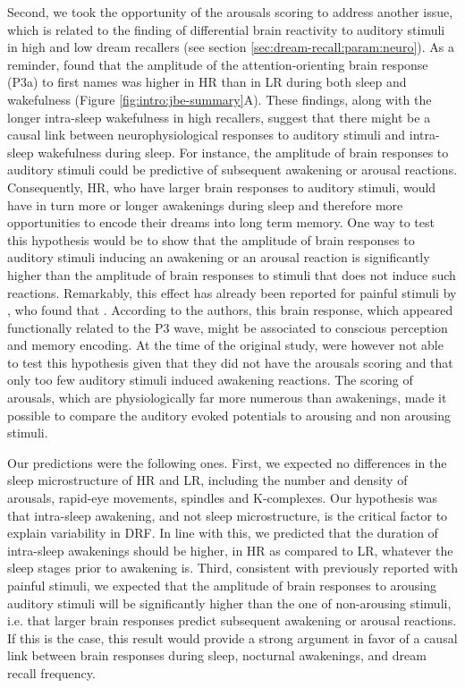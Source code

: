 Second, we took the opportunity of the arousals scoring to address another issue, which is related to the finding of differential brain reactivity to auditory stimuli in high and low dream recallers (see section \ref{sec:dream-recall:param:neuro}). As a reminder, \citet{eichenlaub_brain_2014} found that the amplitude of the attention-orienting brain response (P3a) to first names was higher in HR than in LR during both sleep and wakefulness (Figure \ref{fig:intro:jbe-summary}A). These findings, along with the longer intra-sleep wakefulness in high recallers, suggest that there might be a causal link between neurophysiological responses to auditory stimuli and intra-sleep wakefulness during sleep. For instance, the amplitude of brain responses to auditory stimuli could be predictive of subsequent awakening or arousal reactions. Consequently, HR, who have larger brain responses to auditory stimuli, would have in turn more or longer awakenings during sleep and therefore more opportunities to encode their dreams into long term memory. One way to test this hypothesis would be to show that the amplitude of brain responses to auditory stimuli inducing an awakening or an arousal reaction is significantly higher than the amplitude of brain responses to stimuli that does not induce such reactions. Remarkably, this effect has already been reported for painful stimuli by \citet{bastuji_laser_2008}, who found that . According to the authors, this brain response, which appeared functionally related to the P3 wave, might be associated to conscious perception and memory encoding. At the time of the original study, \citet{eichenlaub_brain_2014} were however not able to test this hypothesis given that they did not have the arousals scoring and that only too few auditory stimuli induced awakening reactions. The scoring of arousals, which are physiologically far more numerous than awakenings, made it possible to compare the auditory evoked potentials to arousing and non arousing stimuli.

Our predictions were the following ones. First, we expected no differences in the sleep microstructure of HR and LR, including the number and density of arousals, rapid-eye movements, spindles and K-complexes. Our hypothesis was that intra-sleep awakening, and not sleep microstructure, is the critical factor to explain variability in DRF. In line with this, we predicted that the duration of intra-sleep awakenings should be higher, in HR as compared to LR, whatever the sleep stages prior to awakening is. Third, consistent with previously reported with painful stimuli, we expected that the amplitude of brain responses to arousing auditory stimuli will be significantly higher than the one of non-arousing stimuli, i.e. that larger brain responses predict subsequent awakening or arousal reactions. If this is the case, this result would provide a strong argument in favor of a causal link between brain responses during sleep, nocturnal awakenings, and dream recall frequency.

